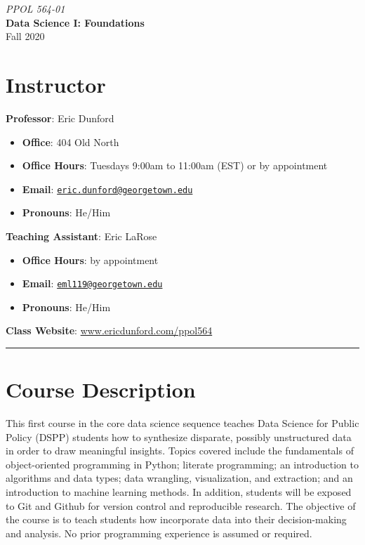 \documentclass[
  12pt,
]{article}
\author{}
\date{\vspace{-2.5em}}
\providecommand{\tightlist}{%
  \setlength{\itemsep}{0pt}\setlength{\parskip}{0pt}}
\begin{document}
\begin{center}

\huge \textit{PPOL 564-01}\\
\huge\textbf{Data Science I: Foundations}\\
\Large Fall 2020

\end{center}

\hypertarget{instructor}{%
\section{Instructor}\label{instructor}}

\textbf{Professor}: Eric Dunford

\begin{itemize}
\tightlist
\item
  \textbf{Office}: 404 Old North
\item
  \textbf{Office Hours}: Tuesdays 9:00am to 11:00am (EST) or by
  appointment
\item
  \textbf{Email}:
  \href{mailto:eric.dunford@georgetown.edu}{\nolinkurl{eric.dunford@georgetown.edu}}
\item
  \textbf{Pronouns}: He/Him
\end{itemize}

\textbf{Teaching Assistant}: Eric LaRose

\begin{itemize}
\tightlist
\item
  \textbf{Office Hours}: by appointment
\item
  \textbf{Email}:
  \href{mailto:eml119@georgetown.edu}{\nolinkurl{eml119@georgetown.edu}}
\item
  \textbf{Pronouns}: He/Him
\end{itemize}

\textbf{Class Website}: \url{www.ericdunford.com/ppol564}

\begin{center}\rule{0.5\linewidth}{0.5pt}\end{center}

\hypertarget{course-description}{%
\section{Course Description}\label{course-description}}

This first course in the core data science sequence teaches Data Science
for Public Policy (DSPP) students how to synthesize disparate, possibly
unstructured data in order to draw meaningful insights. Topics covered
include the fundamentals of object-oriented programming in Python;
literate programming; an introduction to algorithms and data types; data
wrangling, visualization, and extraction; and an introduction to machine
learning methods. In addition, students will be exposed to Git and
Github for version control and reproducible research. The objective of
the course is to teach students how incorporate data into their
decision-making and analysis. No prior programming experience is assumed
or required.
\end{document}
